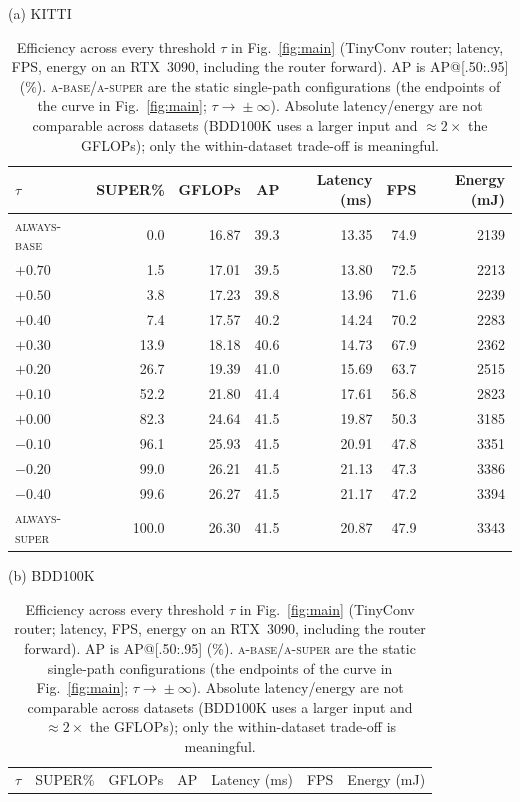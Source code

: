 \begin{table}[t]
\caption{Efficiency across every threshold $\tau$ in Fig.~\ref{fig:main} (TinyConv
router; latency, FPS, energy on an RTX~3090, including the router forward). AP is
AP@[.50:.95] (\%). \textsc{a-base}/\textsc{a-super} are the static single-path
configurations (the endpoints of the curve in Fig.~\ref{fig:main}; $\tau\!\to\!\pm\infty$). Absolute
latency/energy are not comparable across datasets (BDD100K uses a larger input and
$\approx2\times$ the GFLOPs); only the within-dataset trade-off is meaningful.}
\label{tab:device}
\small
\setlength{\tabcolsep}{2.5pt}
\centering
\begin{minipage}[t]{0.49\textwidth}
\centering
{\small (a) KITTI}\\[2pt]
\footnotesize
\begin{tabular}{lrrrrrr}
\toprule
$\tau$ & SUPER\% & GFLOPs & AP & Latency (ms) & FPS & Energy (mJ)\\
\midrule
\textsc{always-base} & 0.0 & 16.87 & 39.3 & 13.35 & 74.9 & 2139\\
$+0.70$ & 1.5 & 17.01 & 39.5 & 13.80 & 72.5 & 2213\\
$+0.50$ & 3.8 & 17.23 & 39.8 & 13.96 & 71.6 & 2239\\
$+0.40$ & 7.4 & 17.57 & 40.2 & 14.24 & 70.2 & 2283\\
$+0.30$ & 13.9 & 18.18 & 40.6 & 14.73 & 67.9 & 2362\\
$+0.20$ & 26.7 & 19.39 & 41.0 & 15.69 & 63.7 & 2515\\
$+0.10$ & 52.2 & 21.80 & 41.4 & 17.61 & 56.8 & 2823\\
$+0.00$ & 82.3 & 24.64 & 41.5 & 19.87 & 50.3 & 3185\\
$-0.10$ & 96.1 & 25.93 & 41.5 & 20.91 & 47.8 & 3351\\
$-0.20$ & 99.0 & 26.21 & 41.5 & 21.13 & 47.3 & 3386\\
$-0.40$ & 99.6 & 26.27 & 41.5 & 21.17 & 47.2 & 3394\\
\textsc{always-super} & 100.0 & 26.30 & 41.5 & 20.87 & 47.9 & 3343\\
\bottomrule
\end{tabular}
\end{minipage}\hfill
\begin{minipage}[t]{0.49\textwidth}
\centering
{\small (b) BDD100K}\\[2pt]
\footnotesize
\begin{tabular}{lrrrrrr}
\toprule
$\tau$ & SUPER\% & GFLOPs & AP & Latency (ms) & FPS & Energy (mJ)\\

\end{tabular}
\end{minipage}
\end{table}

